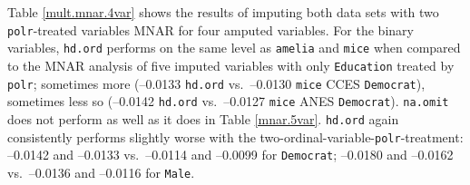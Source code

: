 \documentclass[12pt,econ]{sources/authesis}
\begin{document}
Table \ref{mult.mnar.4var} shows the results of imputing both data sets with two \texttt{polr}-treated variables MNAR for four amputed variables. For the binary variables, \texttt{hd.ord} performs on the same level as \texttt{amelia} and \texttt{mice} when compared to the MNAR analysis of five imputed variables with only \texttt{Education} treated by \texttt{polr}; sometimes more (--0.0133 \texttt{hd.ord} vs.~--0.0130 \texttt{mice} CCES \texttt{Democrat}), sometimes less so (--0.0142 \texttt{hd.ord} vs.~--0.0127 \texttt{mice} ANES \texttt{Democrat}). \texttt{na.omit} does not perform as well as it does in Table \ref{mnar.5var}. \texttt{hd.ord} again consistently performs slightly worse with the two-ordinal-variable-\texttt{polr}-treatment: --0.0142 and --0.0133 vs.~--0.0114 and --0.0099 for \texttt{Democrat}; --0.0180 and --0.0162 vs.~--0.0136 and --0.0116 for \texttt{Male}.
\end{document}
